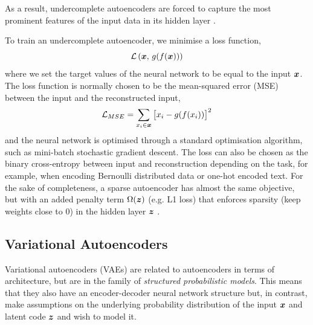 As a result, undercomplete autoencoders are forced to capture the most prominent features of the input data in its hidden layer \cite{DeepLearningBook}. 

To train an undercomplete autoencoder, we minimise a loss function,
\begin{equation}
    \mathcal{L}\,(\boldsymbol{x}, \, g(f(\boldsymbol{x})))
\end{equation}
where we set the target values of the neural network to be equal to the input $\boldsymbol{x}$. The loss function is normally chosen to be the mean-squared error (MSE) between the input and the reconstructed input,
\begin{equation}
    \mathcal{L}_{MSE} = \sum_{x_i \in \boldsymbol{x}} \big[x_i - g(f(x_i))\big]^2 \label{eq:2_autoencoder_mse}
\end{equation}
and the neural network is optimised through a standard optimisation algorithm, such as mini-batch stochastic gradient descent.
The loss can also be chosen as the binary cross-entropy between input and reconstruction depending on the task, for example, when encoding Bernoulli distributed data or one-hot encoded text.
For the sake of completeness, a sparse autoencoder has almost the same objective, but with an added penalty term $\Omega(\boldsymbol{z})$ (e.g. L1 loss) that enforces sparsity (keep weights close to 0) in the hidden layer $\boldsymbol{z}$ \cite{DeepLearningUnipdItaly}.


\subsection{Variational Autoencoders}
\label{subsec:2_VAE_variational_autoencoders}

Variational autoencoders (VAEs) \cite{variational_bayes, vae_stochastic_backprop} are related to autoencoders in terms of architecture, but are in the family of \textit{structured probabilistic models}. This means that they also have an encoder-decoder neural network structure but, in contrast, make assumptions on the underlying probability distribution of the input $\boldsymbol{x}$ and latent code $\boldsymbol{z}$ and wish to model it.

